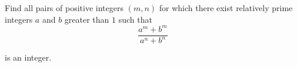 Find all pairs of positive integers $(m,n)$ for which there exist relatively prime integers $a$ and $b$ greater than $1$ such that$$\frac{a^m+b^m}{a^n+b^n}$$

is an integer.